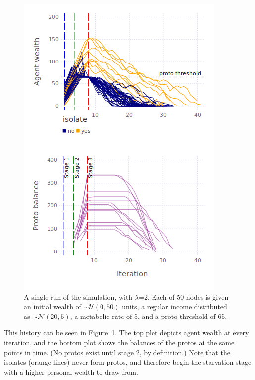 \begin{figure}[ht]
\centering
\includegraphics[width=\columnwidth]{figures/sampleLifeHistory.png}
\caption{A single run of the simulation, with $\lambda$=2. Each of 50 nodes is
given an initial wealth of $\sim\mathcal{U}(0,50)$ units, a regular income
distributed as $\sim\mathcal{N}(20,5)$, a metabolic rate of 5, and a proto
threshold of 65.} \label{fig:singleRun}
\end{figure}

This history can be seen in Figure~\ref{fig:singleRun}. The top plot depicts
agent wealth at every iteration, and the bottom plot shows the balances of the
protos at the same points in time. (No protos exist until stage 2, by
definition.) Note that the isolates (orange lines) never form protos, and
therefore begin the starvation stage with a higher personal wealth to draw
from.


